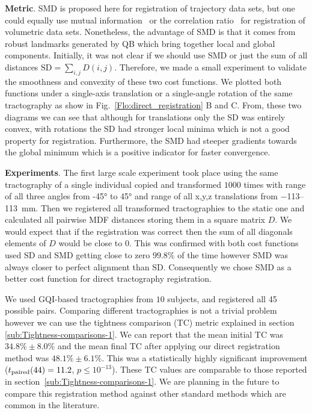 \documentclass[journal]{IEEEtran}
\begin{document}
\textbf{Metric}. SMD is proposed here for registration of trajectory
data sets, but one could equally use mutual
information~\cite{maes1997multimodality} or the correlation
ratio~\cite{roche1998correlation} for registration of volumetric data
sets. Nonetheless, the advantage of SMD is that it comes from robust
landmarks generated by QB which bring together local and global
components. Initially, it was not clear if we should use SMD or just the
sum of all distances $\mathrm{SD}=\sum_{i,j}D(i,j)$. Therefore, we made
a small experiment to validate the smoothness and convexity of these two
cost functions. We plotted both functions under a single-axis
translation or a single-angle rotation of the same tractography as show
in Fig.~\ref{Flo:direct_registration} B and C. From, these two diagrams
we can see that although for translations only the SD was entirely
convex, with rotations the SD had stronger local minima which is not a
good property for registration. Furthermore, the SMD had steeper
gradients towards the global minimum which is a positive indicator for
faster convergence.

\textbf{Experiments}. The first large scale experiment took place using
the same tractography of a single individual copied and transformed
$1000$ times with range of all three angles from \ang{-45} to \ang{45}
and range of all x,y,z translations from \numrange{-113}{113}~mm. Then
we registered all transformed tractographies to the static one and
calculated all pairwise MDF distances storing them in a square matrix
$D$. We would expect that if the registration was correct then the sum
of all diagonals elements of $D$ would be close to $0$. This was
confirmed with both cost functions used SD and SMD getting close to zero
$99.8\%$ of the time however SMD was always closer to perfect alignment
than SD. Consequently we chose SMD as a better cost function for direct
tractography registration.

We used GQI-based tractographies from $10$ subjects, and registered all
45 possible pairs. Comparing different tractographies is not a trivial
problem however we can use the tightness comparison (TC) metric
explained in section \ref{sub:Tightness-comparisons-1}.  We can report
that the mean initial TC was $34.8\%\pm8.0\%$ and the mean final TC
after applying our direct registration method was $48.1\%\pm6.1\%$. This
was a statistically highly significant improvement
($t_{\text{\textrm{paired}}}(44)=11.2$, $p\leq10^{-13}$). These TC
values are comparable to those reported in
section~\ref{sub:Tightness-comparisons-1}. We are planning in the future
to compare this registration method against other standard methods which
are common in the literature.
\end{document}
